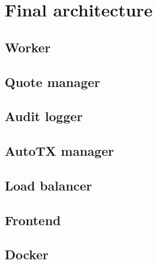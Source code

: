 \section{Final architecture}

\subsection{Worker}

\subsection{Quote manager}

\subsection{Audit logger}

\subsection{AutoTX manager}

\subsection{Load balancer}

\subsection{Frontend}

\subsection{Docker}
